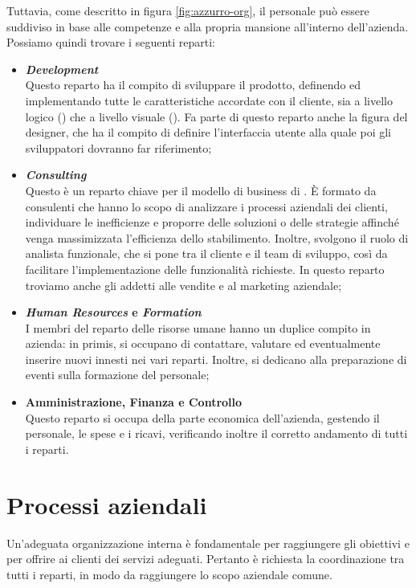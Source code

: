 Tuttavia, come descritto in figura \ref{fig:azzurro-org}, il personale può essere suddiviso in base alle competenze e alla propria mansione all'interno dell'azienda. Possiamo quindi trovare i seguenti reparti:
\begin{itemize}
\item \textbf{\textit{Development}}\\
Questo reparto ha il compito di sviluppare il prodotto, definendo ed implementando tutte le caratteristiche accordate con il cliente, sia a livello logico () che a livello visuale (). Fa parte di questo reparto anche la figura del designer, che ha il compito di definire l'interfaccia utente alla quale poi gli sviluppatori dovranno far riferimento;  
\item \textbf{\textit{Consulting}}\\
Questo è un reparto chiave per il modello di business di \AD{}. \`E formato da consulenti che hanno lo scopo di analizzare i processi aziendali dei clienti, individuare le inefficienze e proporre delle soluzioni o delle strategie affinché venga massimizzata l'efficienza dello stabilimento. Inoltre, svolgono il ruolo di analista funzionale, che si pone tra il cliente e il team di sviluppo, così da facilitare l'implementazione delle funzionalità richieste. In questo reparto troviamo anche gli addetti alle vendite e al marketing aziendale;
\item \textbf{\textit{Human Resources} e \textit{Formation}}\\
I membri del reparto delle risorse umane hanno un duplice compito in azienda: in primis, si occupano di contattare, valutare ed eventualmente inserire nuovi innesti nei vari reparti. Inoltre, si dedicano alla preparazione di eventi sulla formazione del personale;
\item \textbf{Amministrazione, Finanza e Controllo}\\
Questo reparto si occupa della parte economica dell'azienda, gestendo il personale, le spese e i ricavi, verificando inoltre il corretto andamento di tutti i reparti.
\end{itemize}

\section{Processi aziendali}
Un'adeguata organizzazione interna è fondamentale per raggiungere gli obiettivi e per offrire ai clienti dei servizi adeguati. Pertanto è richiesta la coordinazione tra tutti i reparti, in modo da raggiungere lo scopo aziendale comune.

